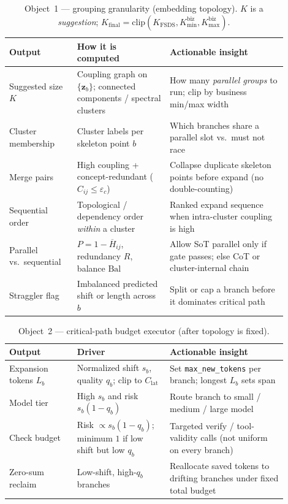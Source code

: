 \documentclass[11pt]{article}
\newcommand{\z}{\mathbf{z}}
\begin{document}
\begin{table}[t]
\centering
\small
\caption{Object~1 --- grouping granularity (embedding topology). $K$ is a
\emph{suggestion}; $K_{\mathrm{final}}=\mathrm{clip}(K_{\mathrm{FSDS}},K_{\min}^{\mathrm{biz}},K_{\max}^{\mathrm{biz}})$.}
\label{tab:obj1-topology}
\begin{tabular}{@{}p{0.22\linewidth}p{0.30\linewidth}p{0.38\linewidth}@{}}
\toprule
Output & How it is computed & Actionable insight \\
\midrule
Suggested size $K$ &
Coupling graph on $\{\z_b\}$; connected components / spectral clusters &
How many \emph{parallel groups} to run; clip by business min/max width \\
Cluster membership &
Cluster labels per skeleton point $b$ &
Which branches share a parallel slot vs.\ must not race \\
Merge pairs &
High coupling + concept-redundant ($C_{ij}\le\varepsilon_c$) &
Collapse duplicate skeleton points before expand (no double-counting) \\
Sequential order &
Topological / dependency order \emph{within} a cluster &
Ranked expand sequence when intra-cluster coupling is high \\
Parallel vs.\ sequential &
$P=1-\overline{H}_{ij}$, redundancy $R$, balance $\mathrm{Bal}$ &
Allow SoT parallel only if gate passes; else CoT or cluster-internal chain \\
Straggler flag &
Imbalanced predicted shift or length across $b$ &
Split or cap a branch before it dominates critical path \\
\bottomrule
\end{tabular}
\end{table}

\begin{table}[t]
\centering
\small
\caption{Object~2 --- critical-path budget executor (after topology is fixed).}
\label{tab:obj2-budget}
\begin{tabular}{@{}p{0.22\linewidth}p{0.30\linewidth}p{0.38\linewidth}@{}}
\toprule
Output & Driver & Actionable insight \\
\midrule
Expansion tokens $L_b$ &
Normalized shift $s_b$, quality $q_b$; clip to $C_{\mathrm{lat}}$ &
Set \texttt{max\_new\_tokens} per branch; longest $L_b$ sets span \\
Model tier &
High $s_b$ and risk $s_b(1-q_b)$ &
Route branch to small / medium / large model \\
Check budget &
Risk $\propto s_b(1-q_b)$; minimum $1$ if low shift but low $q_b$ &
Targeted verify / tool-validity calls (not uniform on every branch) \\
Zero-sum reclaim &
Low-shift, high-$q_b$ branches &
Reallocate saved tokens to drifting branches under fixed total budget \\
\bottomrule
\end{tabular}
\end{table}
\end{document}

